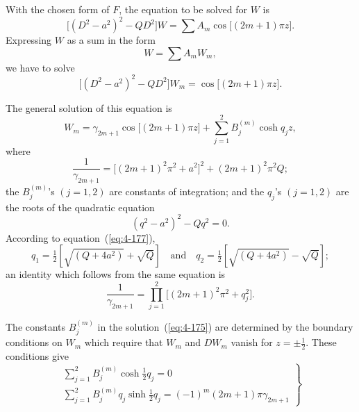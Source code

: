 With the chosen form of $F$, the equation to be solved for $W$ is
\begin{equation}
\label{eq:4-172}
\bigl[(D^2-a^2)^2-QD^2\bigr]W = \sum A_m\cos\bigl[(2m+1)\pi z\bigr].
\end{equation}
Expressing $W$ as a sum in the form
\begin{equation}
\label{eq:4-173}
W = \sum A_m W_m,
\end{equation}
we have to solve
\begin{equation}
\label{eq:4-174}
\bigl[(D^2-a^2)^2-QD^2\bigr]W_m = \cos\bigl[(2m+1)\pi z\bigr].
\end{equation}

The general solution of this equation is
\begin{equation}
\label{eq:4-175}
W_m = \gamma_{2m+1}\cos\bigl[(2m+1)\pi z\bigr]+\sum_{j=1}^{2}B_j^{(m)}\cosh q_j z,
\end{equation}
where
\begin{equation}
\label{eq:4-176}
\frac{1}{\gamma_{2m+1}} = \bigl[(2m+1)^2\pi^2+a^2\bigr]^2+(2m+1)^2\pi^2 Q;
\end{equation}
the $B_j^{(m)}$'s $(j=1,2)$ are constants of integration; and the $q_j$'s $(j=1,2)$ are the roots of the quadratic equation
\begin{equation}
\label{eq:4-177}
(q^2-a^2)^2-Qq^2 = 0.
\end{equation}
According to equation~(\ref{eq:4-177}),
\begin{equation}
\label{eq:4-178}
q_1 = \tfrac{1}{2}[\sqrt{(Q+4a^2)}+\sqrt{Q}] \quad\text{and}\quad q_2 = \tfrac{1}{2}[\sqrt{(Q+4a^2)}-\sqrt{Q}];
\end{equation}
an identity which follows from the same equation is
\begin{equation}
\label{eq:4-179}
\frac{1}{\gamma_{2m+1}} = \prod_{j=1}^{2}\bigl[(2m+1)^2\pi^2+q_j^2\bigr].
\end{equation}

The constants $B_j^{(m)}$ in the solution~(\ref{eq:4-175}) are determined by the boundary conditions on $W_m$ which require that $W_m$ and $DW_m$ vanish for $z=\pm\tfrac{1}{2}$. These conditions give
\begin{equation}
\label{eq:4-180}
\left.\begin{array}{l}
\displaystyle\sum_{j=1}^{2}B_j^{(m)}\cosh\tfrac{1}{2}q_j = 0 \\[6pt]
\displaystyle\sum_{j=1}^{2}B_j^{(m)}q_j\sinh\tfrac{1}{2}q_j = (-1)^m(2m+1)\pi\gamma_{2m+1}
\end{array}\right\}
\end{equation}

